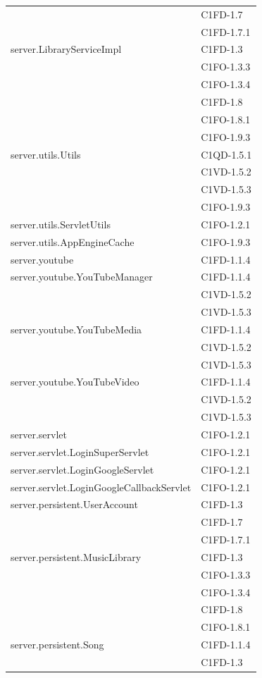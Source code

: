 \begin{footnotesize}
\begin{longtable}[!h]{|l|l|}
& C1FD-1.7\\
& C1FD-1.7.1\\\hline 
server.LibraryServiceImpl  &  C1FD-1.3\\
& C1FO-1.3.3\\
& C1FO-1.3.4\\
& C1FD-1.8\\
& C1FO-1.8.1\\
& C1FO-1.9.3\\\hline  
server.utils.Utils  & C1QD-1.5.1\\
& C1VD-1.5.2\\
& C1VD-1.5.3\\
& C1FO-1.9.3\\\hline 
server.utils.ServletUtils  &  C1FO-1.2.1 \\\hline  
server.utils.AppEngineCache  &  C1FO-1.9.3\\\hline
server.youtube  &  C1FD-1.1.4 \\\hline
server.youtube.YouTubeManager  &  C1FD-1.1.4 \\
& C1VD-1.5.2\\
& C1VD-1.5.3\\\hline
server.youtube.YouTubeMedia  &  C1FD-1.1.4 \\
& C1VD-1.5.2\\
& C1VD-1.5.3\\\hline
server.youtube.YouTubeVideo  &  C1FD-1.1.4 \\
& C1VD-1.5.2\\
& C1VD-1.5.3\\\hline
server.servlet  &  C1FO-1.2.1 \\\hline 
server.servlet.LoginSuperServlet  &  C1FO-1.2.1 \\\hline 
server.servlet.LoginGoogleServlet  &  C1FO-1.2.1 \\\hline 
server.servlet.LoginGoogleCallbackServlet  &  C1FO-1.2.1 \\\hline  
server.persistent.UserAccount  &  C1FD-1.3\\
& C1FD-1.7\\
& C1FD-1.7.1\\\hline 
server.persistent.MusicLibrary  &  C1FD-1.3 \\
& C1FO-1.3.3\\
& C1FO-1.3.4\\
& C1FD-1.8\\
& C1FO-1.8.1\\\hline 
server.persistent.Song  & C1FD-1.1.4 \\
& C1FD-1.3\\

\end{longtable}
\end{footnotesize}
